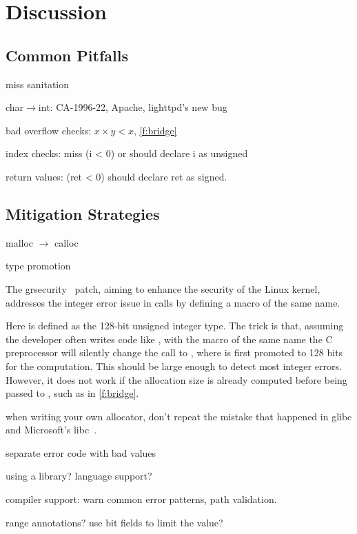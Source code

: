 \section{Discussion}
\label{s:disc}

\subsection{Common Pitfalls}

miss sanitation

char$\to$int: 
CA-1996-22,
Apache,
lighttpd's new bug

bad overflow checks: $x \times y < x$, 
\autoref{f:bridge}

index checks:
miss (i < 0) or should declare i as unsigned

return values: (ret < 0)
should declare ret as signed.

\subsection{Mitigation Strategies}

malloc $\to$ calloc

type promotion

The grsecurity~\cite{grsecurity} patch, aiming to enhance the
security of the Linux kernel, addresses the integer error issue
in  calls by defining a macro of the same name.
%

%
Here  is defined as the 128-bit unsigned integer
type.  The trick is that, assuming the developer often writes code
like , with the macro of the same name
the C preprocessor will silently change the call to
, where  is first
promoted to 128 bits for the computation.  This should be large
enough to detect most integer errors.  However, it does not work
if the allocation size is already computed before being passed to
, such as in \autoref{f:bridge}.

when writing your own allocator, don't repeat the mistake that
happened in glibc and Microsoft's libc~\cite{rus-cert:calloc}.

separate error code with bad values

using a library? language support?

compiler support: warn common error patterns,
path validation.

range annotations? use bit fields to limit the value?

